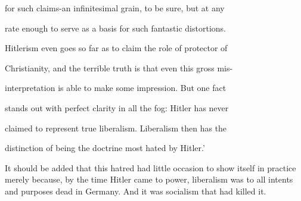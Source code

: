 \documentclass[11pt,openany]{book}
\begin{document}
for such claims-an infinitesimal grain, to be sure, but at any

rate enough to serve as a basis for such fantastic distortions.

Hitlerism even goes so far as to claim the role of protector of

Christianity, and the terrible truth is that even this gross mis-

interpretation is able to make some impression. But one fact

stands out with perfect clarity in all the fog: Hitler has never

claimed to represent true liberalism. Liberalism then has the

distinction of being the doctrine most hated by Hitler.'

It should be added that this hatred had little occasion to show itself in practice merely because, by the time Hitler came to power, liberalism was to all intents and purposes dead in Germany. And it was socialism that had killed it.

\begin{center}\textasteriskcentered\hspace{0.9em}\textasteriskcentered\hspace{0.9em}\textasteriskcentered\end{center}

\begin{center}\textasteriskcentered\hspace{0.9em}\textasteriskcentered\hspace{0.9em}\textasteriskcentered\end{center}

\begin{center}\textasteriskcentered\hspace{0.9em}\textasteriskcentered\hspace{0.9em}\textasteriskcentered\end{center}

\begin{center}\textasteriskcentered\hspace{0.9em}\textasteriskcentered\hspace{0.9em}\textasteriskcentered\end{center}

\begin{center}\textasteriskcentered\hspace{0.9em}\textasteriskcentered\hspace{0.9em}\textasteriskcentered\end{center}
\end{document}
